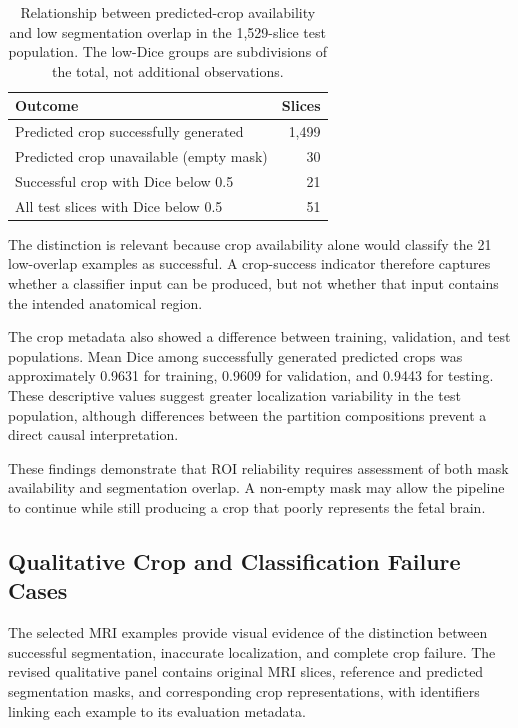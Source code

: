 \begin{table}[htbp]
\centering
\caption{Relationship between predicted-crop availability and low segmentation overlap in the 1,529-slice test population. The low-Dice groups are subdivisions of the total, not additional observations.}
\label{tab:roi_low_dice}
\begin{tabular}{lr}
\hline
Outcome & Slices \\
\hline
Predicted crop successfully generated & 1,499 \\
Predicted crop unavailable (empty mask) & 30 \\
Successful crop with Dice below 0.5 & 21 \\
All test slices with Dice below 0.5 & 51 \\
\hline
\end{tabular}
\end{table}

The distinction is relevant because crop availability alone would classify the 21 low-overlap examples as successful. A crop-success indicator therefore captures whether a classifier input can be produced, but not whether that input contains the intended anatomical region.

The crop metadata also showed a difference between training, validation, and test populations. Mean Dice among successfully generated predicted crops was approximately 0.9631 for training, 0.9609 for validation, and 0.9443 for testing. These descriptive values suggest greater localization variability in the test population, although differences between the partition compositions prevent a direct causal interpretation.

These findings demonstrate that ROI reliability requires assessment of both mask availability and segmentation overlap. A non-empty mask may allow the pipeline to continue while still producing a crop that poorly represents the fetal brain.

\subsection{Qualitative Crop and Classification Failure Cases}
\label{subsec:results_crop_qualitative}

The selected MRI examples provide visual evidence of the distinction between successful segmentation, inaccurate localization, and complete crop failure. The revised qualitative panel contains original MRI slices, reference and predicted segmentation masks, and corresponding crop representations, with identifiers linking each example to its evaluation metadata.

